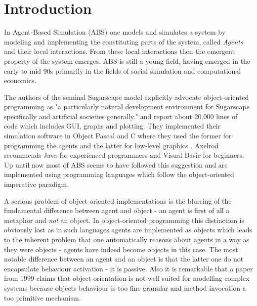 \section{Introduction}

In Agent-Based Simulation (ABS) one models and simulates a system by modeling and implementing the constituting parts of the system, called \textit{Agents} and their local interactions. From these local interactions then the emergent property of the system emerges. ABS is still a young field, having emerged in the early to mid 90s primarily in the fields of social simulation and computational economics. 

The authors of the seminal Sugarscape model \cite{epstein_growing_1996} explicitly advocate object-oriented programming as "a particularly natural development environment for Sugarscape specifically and artificial societies generally." and report about 20.000 lines of code which includes GUI, graphs and plotting. They implemented their simulation software in Object Pascal and C where they used the former for programming the agents and the latter for low-level graphics \cite{axtell_aligning_1996}. Axelrod \cite{axelrod_advancing_1997} recommends Java for experienced programmers and Visual Basic for beginners. Up until now most of ABS seems to have followed this suggestion and are implemented using programming languages which follow the object-oriented imperative paradigm.

A serious problem of object-oriented implementations is the blurring of the fundamental difference between agent and object - an agent is first of all a metaphor and \textit{not} an object. In object-oriented programming this distinction is obviously lost as in such languages agents are implemented as objects which leads to the inherent problem that one automatically reasons about agents in a way as they were objects - agents have indeed become objects in this case. The most notable difference between an agent and an object is that the latter one do not encapsulate behaviour activation \cite{jennings_agent-based_2000} - it is passive. Also it is remarkable that \cite{jennings_agent-based_2000} a paper from 1999 claims that object-orientation is not well suited for modelling complex systems because objects behaviour is too fine granular and method invocation a too primitive mechanism.

